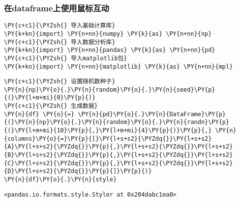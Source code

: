     \hypertarget{ux5728dataframeux4e0aux4f7fux7528ux9f20ux6807ux4e92ux52a8}{%
\subsubsection{在dataframe上使用鼠标互动}\label{ux5728dataframeux4e0aux4f7fux7528ux9f20ux6807ux4e92ux52a8}}

    \begin{tcolorbox}[breakable, size=fbox, boxrule=1pt, pad at break*=1mm,colback=cellbackground, colframe=cellborder]
\begin{Verbatim}[commandchars=\\\{\}]
\PY{c+c1}{\PYZsh{} 导入基础计算库}
\PY{k+kn}{import} \PY{n+nn}{numpy} \PY{k}{as} \PY{n+nn}{np}
\PY{c+c1}{\PYZsh{} 导入数据分析库}
\PY{k+kn}{import} \PY{n+nn}{pandas} \PY{k}{as} \PY{n+nn}{pd}
\PY{c+c1}{\PYZsh{} 导入matplotlib包}
\PY{k+kn}{import} \PY{n+nn}{matplotlib} \PY{k}{as} \PY{n+nn}{mpl}
\end{Verbatim}
\end{tcolorbox}

    \begin{tcolorbox}[breakable, size=fbox, boxrule=1pt, pad at break*=1mm,colback=cellbackground, colframe=cellborder]
\begin{Verbatim}[commandchars=\\\{\}]
\PY{c+c1}{\PYZsh{} 设置随机数种子}
\PY{n}{np}\PY{o}{.}\PY{n}{random}\PY{o}{.}\PY{n}{seed}\PY{p}{(}\PY{l+m+mi}{0}\PY{p}{)}
\PY{c+c1}{\PYZsh{} 生成数据}
\PY{n}{df} \PY{o}{=} \PY{n}{pd}\PY{o}{.}\PY{n}{DataFrame}\PY{p}{(}\PY{n}{np}\PY{o}{.}\PY{n}{random}\PY{o}{.}\PY{n}{randn}\PY{p}{(}\PY{l+m+mi}{10}\PY{p}{,}\PY{l+m+mi}{4}\PY{p}{)}\PY{p}{,} \PY{n}{columns}\PY{o}{=}\PY{p}{[}\PY{l+s+s2}{\PYZdq{}}\PY{l+s+s2}{A}\PY{l+s+s2}{\PYZdq{}}\PY{p}{,}\PY{l+s+s2}{\PYZdq{}}\PY{l+s+s2}{B}\PY{l+s+s2}{\PYZdq{}}\PY{p}{,}\PY{l+s+s2}{\PYZdq{}}\PY{l+s+s2}{C}\PY{l+s+s2}{\PYZdq{}}\PY{p}{,}\PY{l+s+s2}{\PYZdq{}}\PY{l+s+s2}{D}\PY{l+s+s2}{\PYZdq{}}\PY{p}{]}\PY{p}{)}
\PY{n}{df}\PY{o}{.}\PY{n}{style}
\end{Verbatim}
\end{tcolorbox}

            \begin{tcolorbox}[breakable, size=fbox, boxrule=.5pt, pad at break*=1mm, opacityfill=0]
\begin{Verbatim}[commandchars=\\\{\}]
<pandas.io.formats.style.Styler at 0x204dabc1ea0>
\end{Verbatim}
\end{tcolorbox}
        
